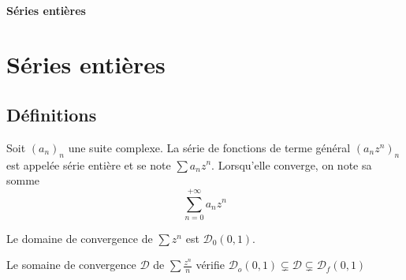 \ifsolo
    ~

    \vspace{1cm}

    \begin{center}
        \textbf{\LARGE Séries entières} \\[1em]
    \end{center}
    \tableofcontents
\else
    \chapter{Séries entières}

    \minitoc
\fi
\thispagestyle{empty}

\section{Définitions}

\begin{dfn}
    Soit $(a_n)_n$ une suite complexe. La série de fonctions de terme général $(a_nz^n)_n$ est appelée série entière et se note $\sum a_nz^n$. Lorsqu'elle converge, on note sa somme \[
        \sum_{n=0}^{+\infty}a_nz^n
    \]
\end{dfn}

\begin{ex}
    Le domaine de convergence de $\sum z^n$ est $\mathcal D_0(0, 1)$.

    Le somaine de convergence $\mathcal D$ de $\sum \frac{z^n}n$ vérifie $\mathcal D_o(0, 1)\subsetneq\mathcal D\subsetneq \mathcal D_f(0, 1)$
\end{ex}

